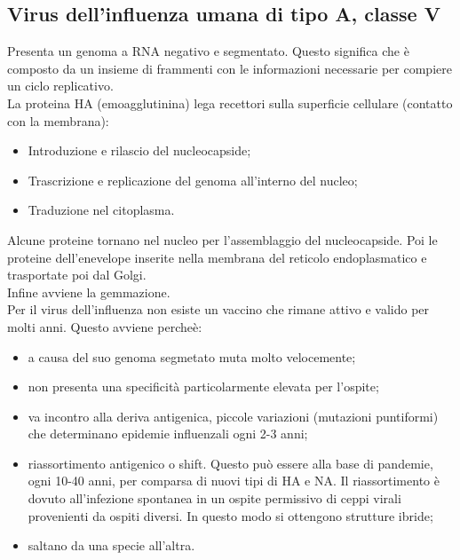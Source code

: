 \subsection{Virus dell'influenza umana di tipo A, classe V}
Presenta un genoma a RNA negativo e segmentato. Questo significa che \`e composto da un insieme di frammenti con le informazioni necessarie per compiere un ciclo replicativo. 
\\La proteina HA (emoagglutinina) lega recettori sulla superficie cellulare (contatto con la membrana):
\begin{itemize}
    \item Introduzione e rilascio del nucleocapside; 
    \item Trascrizione e replicazione del genoma all'interno del nucleo; 
    \item Traduzione nel citoplasma.
\end{itemize}
Alcune proteine tornano nel nucleo per l'assemblaggio del nucleocapside. Poi le proteine dell'enevelope inserite nella membrana del reticolo endoplasmatico e trasportate poi dal Golgi. 
\\Infine avviene la gemmazione.
\\Per il virus dell'influenza non esiste un vaccino che rimane attivo e valido per molti anni. Questo avviene perche\`e:
\begin{itemize}
    \item a causa del suo genoma segmetato muta molto velocemente; 
    \item non presenta una specificit\`a particolarmente elevata per l'ospite;
    \item va incontro alla deriva antigenica, piccole variazioni (mutazioni puntiformi) che determinano epidemie influenzali ogni 2-3 anni; 
    \item riassortimento antigenico o shift. Questo pu\`o essere alla base di pandemie, ogni 10-40 anni, per comparsa di nuovi tipi di HA e NA. Il riassortimento \`e dovuto all'infezione spontanea in un ospite permissivo di ceppi virali provenienti da ospiti diversi. In questo modo si ottengono strutture ibride; 
    \item saltano da una specie all'altra. 
\end{itemize}
